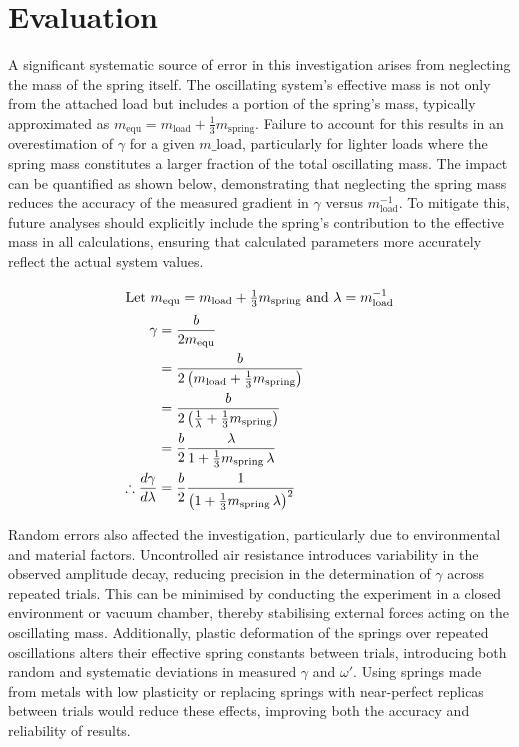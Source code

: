 \section{Evaluation}

A significant systematic source of error in this investigation arises from neglecting the mass of the spring itself. The oscillating system’s effective mass is not only from the attached load but includes a portion of the spring’s mass, typically approximated as $m_{\mathrm{equ}} = m_{\mathrm{load}} + \tfrac{1}{3} m_{\mathrm{spring}}$. Failure to account for this results in an overestimation of $\gamma$ for a given $m\_{\mathrm{load}}$, particularly for lighter loads where the spring mass constitutes a larger fraction of the total oscillating mass. The impact can be quantified as shown below, demonstrating that neglecting the spring mass reduces the accuracy of the measured gradient in $\gamma$ versus $m_{\mathrm{load}}^{-1}$. To mitigate this, future analyses should explicitly include the spring’s contribution to the effective mass in all calculations, ensuring that calculated parameters more accurately reflect the actual system values.

\begin{align*}
\intertext{Let $m_{\mathrm{equ}} = m_{\mathrm{load}} + \tfrac{1}{3} m_{\mathrm{spring}}$ and $\lambda = m_{\mathrm{load}}^{-1}$}
\gamma &= \frac{b}{2 m_{\mathrm{equ}}} \\
       &= \frac{b}{2 \left(m_{\mathrm{load}} + \tfrac{1}{3} m_{\mathrm{spring}}\right)} \\
       &= \frac{b}{2 \left(\tfrac{1}{\lambda} + \tfrac{1}{3} m_{\mathrm{spring}}\right)} \\
       &= \frac{b}{2} \frac{\lambda}{1 + \tfrac{1}{3} m_{\mathrm{spring}} \, \lambda} \\
\therefore \frac{d \gamma}{d \lambda} &= \frac{b}{2} \frac{1}{\left(1 + \tfrac{1}{3} m_{\mathrm{spring}} \, \lambda\right)^2}
\end{align*}
\vspace{1em}

Random errors also affected the investigation, particularly due to environmental and material factors. Uncontrolled air resistance introduces variability in the observed amplitude decay, reducing precision in the determination of $\gamma$ across repeated trials. This can be minimised by conducting the experiment in a closed environment or vacuum chamber, thereby stabilising external forces acting on the oscillating mass. Additionally, plastic deformation of the springs over repeated oscillations alters their effective spring constants between trials, introducing both random and systematic deviations in measured $\gamma$ and $\omega'$. Using springs made from metals with low plasticity or replacing springs with near-perfect replicas between trials would reduce these effects, improving both the accuracy and reliability of results.
